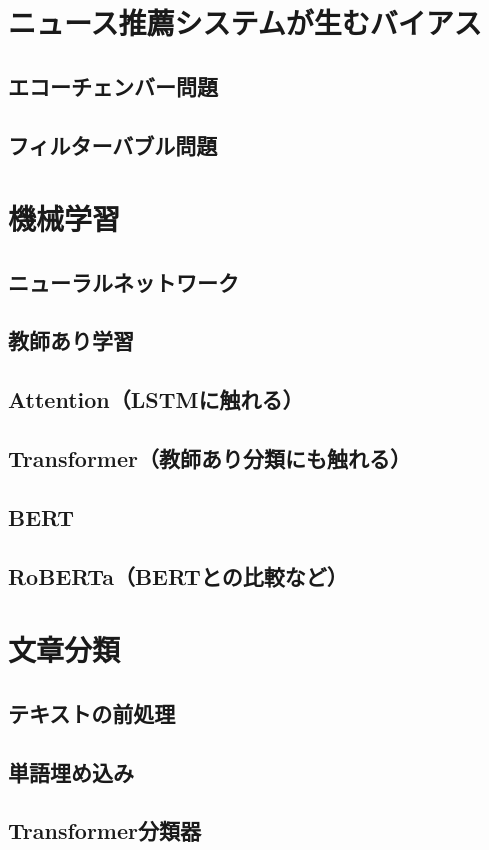 \documentclass[12pt,a4j]{jreport}
\begin{document}
\section{ニュース推薦システムが生むバイアス}
    \subsection{エコーチェンバー問題}
    \subsection{フィルターバブル問題}
\section{機械学習}
    \subsection{ニューラルネットワーク}
    \subsection{教師あり学習}
    \subsection{Attention（LSTMに触れる）}
    \subsection{Transformer（教師あり分類にも触れる）}
    \subsection{BERT}
    \subsection{RoBERTa（BERTとの比較など）}
\section{文章分類}
    \subsection{テキストの前処理}
    \subsection{単語埋め込み}
    \subsection{Transformer分類器}
\end{document}
